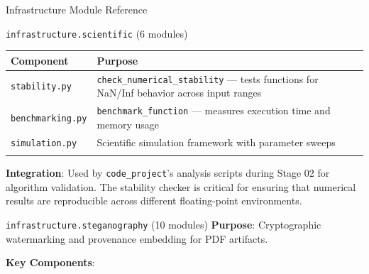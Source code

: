 \documentclass[
  ignorenonframetext,
]{beamer}
\newcounter{none} %
\begin{document}
\begin{frame}[fragile]{Infrastructure Module Reference}
\begin{block}{\texttt{infrastructure.scientific} (6 modules)}
{\def\LTcaptype{none} %
\begin{longtable}[]{@{}
  >{\raggedright\arraybackslash}p{}
  >{\raggedright\arraybackslash}p{}@{}}
\toprule\noalign{}
\begin{minipage}[b]{\linewidth}\raggedright
Component
\end{minipage} & \begin{minipage}[b]{\linewidth}\raggedright
Purpose
\end{minipage} \\
\midrule\noalign{}
\endhead
\texttt{stability.py} & \texttt{check\_numerical\_stability} --- tests
functions for NaN/Inf behavior across input ranges \\
\texttt{benchmarking.py} & \texttt{benchmark\_function} --- measures
execution time and memory usage \\
\texttt{simulation.py} & Scientific simulation framework with parameter
sweeps \\
\bottomrule\noalign{}
\end{longtable}
}

\textbf{Integration}: Used by \texttt{code\_project}'s analysis scripts
during Stage 02 for algorithm validation. The stability checker is
critical for ensuring that numerical results are reproducible across
different floating-point environments.
\end{block}

\begin{block}{\texttt{infrastructure.steganography} (10 modules)}
\protect{}\label{infrastructure.steganography-10-modules}
\textbf{Purpose}: Cryptographic watermarking and provenance embedding
for PDF artifacts.

\textbf{Key Components}:


\end{block}
\end{frame}
\end{document}
